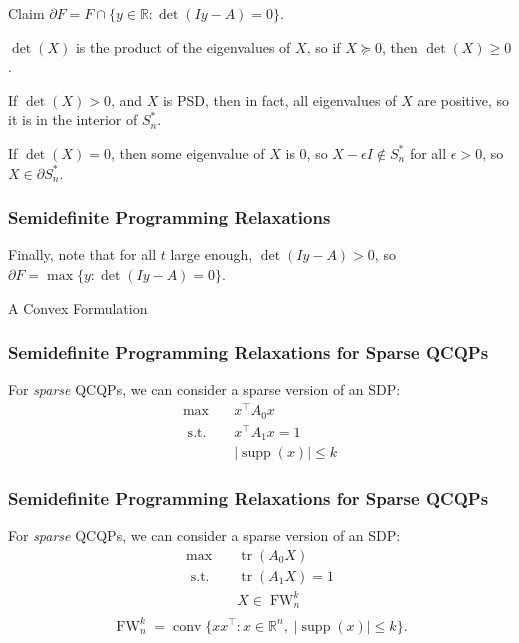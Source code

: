 \documentclass{beamer}
\newcommand{\R}{\mathbb{R}}
\DeclareMathOperator*{\supp}{supp}
\DeclareMathOperator{\conv}{\operatorname{conv}}
\DeclareMathOperator{\FW}{FW}
\DeclareMathOperator{\tr}{tr}
\newcommand{\st}{{\text{ s.t. }}}
\begin{document}
\begin{frame}
    \begin{block}{Claim}
        $\partial F = F \cap \{y \in \R : \det(Iy - A) = 0 \}$.
    \end{block}
    \pause

    $\det(X)$ is the product of the eigenvalues of $X$, so if $X \succeq 0$, then $\det(X) \ge 0$.
    \pause

    If $\det(X) > 0$, and $X$ is PSD, then in fact, all eigenvalues of $X$ are positive, so it is in the interior of $S_n^*$.
    \pause

    If $\det(X) = 0$, then some eigenvalue of $X$ is 0, so $X - \epsilon I \not \in S_n^*$ for all $\epsilon > 0$, so $X \in \partial S_n^*$.
\end{frame}
\begin{frame}
\frametitle{Semidefinite Programming Relaxations}
    Finally, note that for all $t$ large enough, $\det(Iy - A) > 0$, so $\partial F = \max \{y : \det(Iy - A) = 0 \}$.
\end{frame}
\begin{frame}
    \centering
    \huge
    {\color{gray}A Convex Formulation}
\end{frame}
\begin{frame}
\frametitle{Semidefinite Programming Relaxations for Sparse QCQPs}
    For \emph{sparse} QCQPs, we can consider a sparse version of an SDP:
    \begin{equation*}
        \begin{aligned}
            \max\quad & x^{\intercal}A_0x\\
            \st & x^{\intercal}A_1x = 1\\
                &|\supp(x)| \le k
        \end{aligned}
    \end{equation*}
    \vspace{0.3in}
\end{frame}
\begin{frame}
\frametitle{Semidefinite Programming Relaxations for Sparse QCQPs}
    For \emph{sparse} QCQPs, we can consider a sparse version of an SDP:
    \begin{equation*}
        \begin{aligned}
            \max\quad & \tr(A_0X)\\
            \st & \tr(A_1X) = 1\\
                & X \in \FW^k_n\\
        \end{aligned}
    \end{equation*}
    \pause 
    \[
        \FW^k_n = \conv \{xx^{\intercal} : x\in \R^n,\;|\supp(x)| \le k\}.
    \]
\end{frame}
\end{document}
